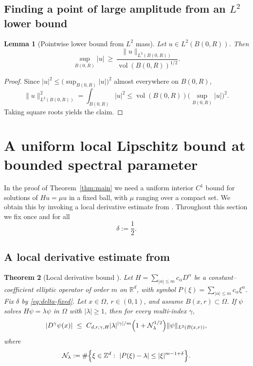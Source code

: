 \documentclass[12pt, reqno]{amsart}
\theoremstyle{plain}
\newtheorem{thm}{Theorem}[section]
\newtheorem{lem}[thm]{Lemma}
\theoremstyle{remark}
\newcommand{\R}{\mathbb{R}}
\newcommand{\Z}{\mathbb{Z}}
\newcommand{\vol}{\operatorname{vol}}
\begin{document}
\subsection{Finding a point of large amplitude from an $L^2$ lower bound}

\begin{lem}[Pointwise lower bound from $L^2$ mass]\label{lem:L2-to-Linfty}
Let $u\in L^2(B(0,R))$. Then
$$
\sup_{B(0,R)} |u|\ \ge\ \frac{\|u\|_{L^2(B(0,R))}}{\vol(B(0,R))^{1/2}}.
$$
\end{lem}

\begin{proof}
Since $|u|^2\le \big(\sup_{B(0,R)}|u|\big)^2$ almost everywhere on $B(0,R)$,
$$
\|u\|_{L^2(B(0,R))}^2 = \int_{B(0,R)}|u|^2
\le \vol(B(0,R)) \Big(\sup_{B(0,R)}|u|\Big)^2.
$$
Taking square roots yields the claim.
\end{proof}

\section{A uniform local Lipschitz bound at bounded spectral parameter}

In the proof of Theorem~\ref{thm:main} we need a uniform interior $C^1$ bound for solutions of
$Hu = \mu u$ in a fixed ball, with $\mu$ ranging over a compact set.
We obtain this by invoking a local derivative estimate from \cite{FU24}.
Throughout this section we fix once and for all
\begin{equation}\label{eq:delta-fixed}
\delta := \frac12.
\end{equation}

\subsection{A local derivative estimate from \cite{FU24}}

\begin{thm}[Local derivative bound {\cite[Theorem~1.1]{FU24}}]\label{thm:FU24}
Let $H = \sum_{|\alpha|\le m}c_\alpha D^\alpha$ be a constant--coefficient elliptic operator of order $m$ on $\R^d$, with symbol $P(\xi) = \sum_{|\alpha|\le m}c_\alpha\xi^\alpha$.
Fix $\delta$ by \eqref{eq:delta-fixed}.
Let $x\in\Omega$, $r\in(0,1)$, and assume $B(x,r)\subset\Omega$.
If $\psi$ solves $H\psi = \lambda\psi$ in $\Omega$ with $|\lambda|\ge 1$, then for every multi-index $\gamma$,
$$
|D^\gamma \psi(x)|
\ \le\ C_{d,r,\gamma,H} |\lambda|^{|\gamma|/m}\Bigl(1+\mathcal N_\lambda^{1/2}\Bigr) 
\|\psi\|_{L^2(B(x,r))},
$$
where
$$
\mathcal N_\lambda := \#\Bigl\{\xi\in\Z^d:\ |P(\xi)-\lambda|\le |\xi|^{m-1+\delta}\Bigr\}.
$$
\end{thm}
\end{document}
